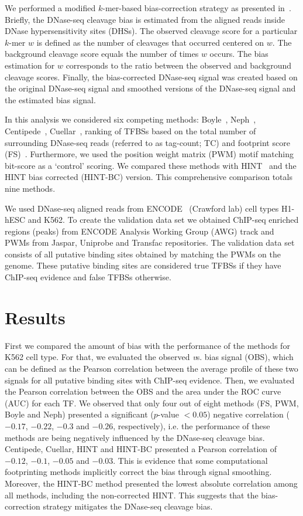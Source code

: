 \documentclass{AbstractTemplate}
\begin{document}
We performed a modified $k$-mer-based bias-correction strategy as presented in~\cite{he2014}. Briefly, the DNase-seq cleavage bias is estimated from the aligned reads inside DNase hypersensitivity sites (DHSs). The observed cleavage score for a particular $k$-mer $w$ is defined as the number of cleavages that occurred centered on $w$. The background cleavage score equals the number of times $w$ occurs. The bias estimation for $w$ corresponds to the ratio between the observed and background cleavage scores. Finally, the bias-corrected DNase-seq signal was created based on the original DNase-seq signal and smoothed versions of the DNase-seq signal and the estimated bias signal.

In this analysis we considered six competing methods: Boyle~\cite{boyle2011}, Neph~\cite{neph2012a}, Centipede~\cite{pique2011}, Cuellar~\cite{cuellar2012}, ranking of TFBSs based on the total number of surrounding DNase-seq reads (referred to as tag-count; TC) and footprint score (FS)~\cite{he2014}. Furthermore, we used the position weight matrix (PWM) motif matching bit-score as a `control' scoring. We compared these methods with HINT~\cite{gusmao2014} and the HINT bias corrected (HINT-BC) version. This comprehensive comparison totals nine methods.

We used DNase-seq aligned reads from ENCODE~\cite{encode2012} (Crawford lab) cell types H1-hESC and K562. To create the validation data set we obtained ChIP-seq enriched regions (peaks) from ENCODE Analysis Working Group (AWG) track and PWMs from Jaspar, Uniprobe and Transfac repositories. The validation data set consists of all putative binding sites obtained by matching the PWMs on the genome. These putative binding sites are considered true TFBSs if they have ChIP-seq evidence and false TFBSs otherwise.

\section{Results}
\label{sec:results}

First we compared the amount of bias with the performance of the methods for K562 cell type. For that, we evaluated the observed {\emph vs.} bias signal (OBS), which can be defined as the Pearson correlation between the average profile of these two signals for all putative binding sites with ChIP-seq evidence. Then, we evaluated the Pearson correlation between the OBS and the area under the ROC curve (AUC) for each TF. We observed that only four out of eight methods (FS, PWM, Boyle and Neph) presented a significant ($p$-value $< 0.05$) negative correlation ($-0.17$, $-0.22$, $-0.3$ and $-0.26$, respectively), i.e. the performance of these methods are being negatively influenced by the DNase-seq cleavage bias. Centipede, Cuellar, HINT and HINT-BC presented a Pearson correlation of $-0.12$, $-0.1$, $-0.05$ and $-0.03$. This is evidence that some computational footprinting methods implicitly correct the bias through signal smoothing. Moreover, the HINT-BC method presented the lowest absolute correlation among all methods, including the non-corrected HINT. This suggests that the bias-correction strategy mitigates the DNase-seq cleavage bias.
\end{document}
